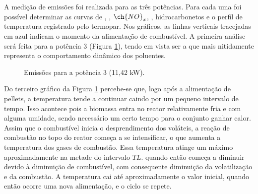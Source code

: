 A medição de emissões foi realizada para as três potências. Para cada uma foi possível determinar as curvas de , , $\ch{NO}_{x}$, , hidrocarbonetos e o perfil de temperatura registrado pelo termopar. Nos gráficos, as linhas verticais tracejadas em azul indicam o momento da alimentação de combustível. A primeira análise será feita para a potência 3 (Figura \ref{fig:emissoespot3}), tendo em vista ser a que mais nitidamente representa o comportamento dinâmico dos poluentes.

\begin{figure}[!ht]
	\centering
	\caption{Emissões para a potência 3 (11,42 kW).}
	\label{fig:emissoespot3}
\end{figure}

Do terceiro gráfico da Figura \ref{fig:emissoespot3} percebe-se que, logo após a alimentação de pellets, a temperatura tende a continuar caindo por um pequeno intervalo de tempo. Isso acontece pois a biomassa entra no reator relativamente fria e com alguma umidade, sendo necessário um certo tempo para o conjunto ganhar calor. Assim que o combustível inicia o desprendimento dos voláteis, a reação de combustão no topo do reator começa a se intensificar, o que aumenta a temperatura dos gases de combustão. Essa temperatura atinge um máximo aproximadamente na metade do intervalo $TL$. quando então começa a diminuir devido à diminuição de combustível, com consequente diminuição da volatilização e da combustão. A temperatura cai até aproximadamente o valor inicial, quando então ocorre uma nova alimentação, e o ciclo se repete.

